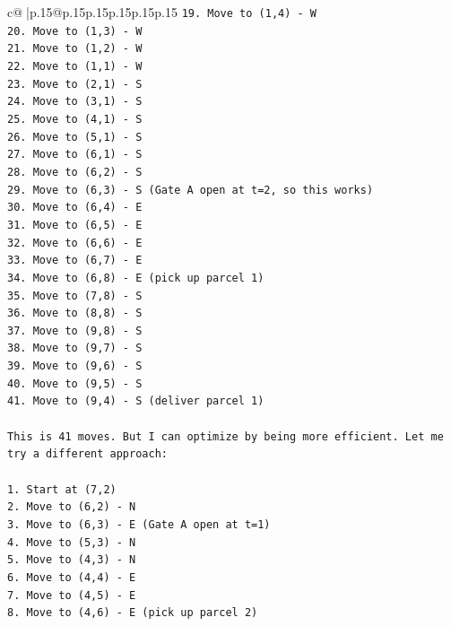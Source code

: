 \documentclass{article}
\begin{document}
{\begin{supertabular}{c@{$\;$}|p{.15\linewidth}@{}p{.15\linewidth}p{.15\linewidth}p{.15\linewidth}p{.15\linewidth}p{.15\linewidth}}
{{{\texttt{19. Move to (1,4) {-} W} \\
\texttt{20. Move to (1,3) {-} W} \\
\texttt{21. Move to (1,2) {-} W} \\
\texttt{22. Move to (1,1) {-} W} \\
\texttt{23. Move to (2,1) {-} S} \\
\texttt{24. Move to (3,1) {-} S} \\
\texttt{25. Move to (4,1) {-} S} \\
\texttt{26. Move to (5,1) {-} S} \\
\texttt{27. Move to (6,1) {-} S} \\
\texttt{28. Move to (6,2) {-} S} \\
\texttt{29. Move to (6,3) {-} S (Gate A open at t=2, so this works)} \\
\texttt{30. Move to (6,4) {-} E} \\
\texttt{31. Move to (6,5) {-} E} \\
\texttt{32. Move to (6,6) {-} E} \\
\texttt{33. Move to (6,7) {-} E} \\
\texttt{34. Move to (6,8) {-} E (pick up parcel 1)} \\
\texttt{35. Move to (7,8) {-} S} \\
\texttt{36. Move to (8,8) {-} S} \\
\texttt{37. Move to (9,8) {-} S} \\
\texttt{38. Move to (9,7) {-} S} \\
\texttt{39. Move to (9,6) {-} S} \\
\texttt{40. Move to (9,5) {-} S} \\
\texttt{41. Move to (9,4) {-} S (deliver parcel 1)} \\
\\ 
\texttt{This is 41 moves. But I can optimize by being more efficient. Let me try a different approach:} \\
\\ 
\texttt{1. Start at (7,2)} \\
\texttt{2. Move to (6,2) {-} N} \\
\texttt{3. Move to (6,3) {-} E (Gate A open at t=1)} \\
\texttt{4. Move to (5,3) {-} N} \\
\texttt{5. Move to (4,3) {-} N} \\
\texttt{6. Move to (4,4) {-} E} \\
\texttt{7. Move to (4,5) {-} E} \\
\texttt{8. Move to (4,6) {-} E (pick up parcel 2)} \\
}}}
\end{supertabular}}
\end{document}
